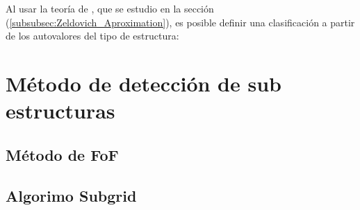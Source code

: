 Al usar la teoría de \cite{zeldovich1970}, que se estudio en la sección (\ref{subsubsec:Zeldovich_Aproximation}), es posible definir una clasificación a partir de los autovalores del tipo de estructura:











\section{Método de detección de sub estructuras}
\label{sec: detección sub-estructuras}

    \subsection{Método de FoF}
    \label{subsec: FoF}


    \subsection{Algorimo Subgrid}
    \label{subsec: Algoritmo subgrid}


















